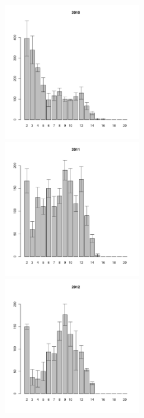 \documentclass[12pt, a4paper]{article}
\begin{document}
\newpage \begin{figure}[h] 

\begin{multicols}{3}
\hfill
\includegraphics[width=60mm]{../White_Sea/Estuatiy_Luvenga/sizestr2_2010_.pdf}
\hfill
\end{multicols}

\begin{multicols}{3}
\hfill
\includegraphics[width=60mm]{../White_Sea/Estuatiy_Luvenga/sizestr2_2011_.pdf}
\end{multicols}



\begin{multicols}{3}
\hfill
\includegraphics[width=60mm]{../White_Sea/Estuatiy_Luvenga/sizestr2_2012_.pdf}
\end{multicols}


\end{figure}
\end{document}
